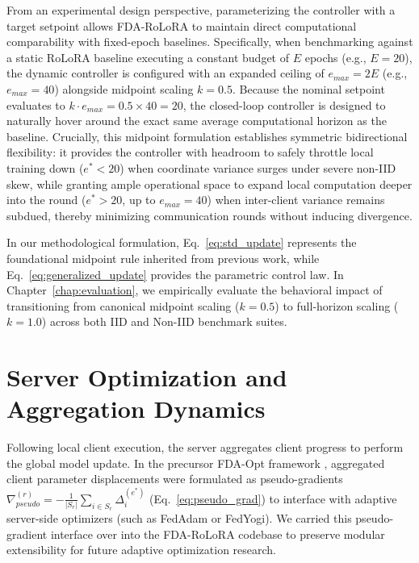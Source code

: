 From an experimental design perspective, parameterizing the controller with a target setpoint allows FDA-RoLoRA to maintain direct computational comparability with fixed-epoch baselines. Specifically, when benchmarking against a static RoLoRA baseline executing a constant budget of $E$ epochs (e.g., $E=20$), the dynamic controller is configured with an expanded ceiling of $e_{max} = 2E$ (e.g., $e_{max} = 40$) alongside midpoint scaling $k = 0.5$. Because the nominal setpoint evaluates to $k \cdot e_{max} = 0.5 \times 40 = 20$, the closed-loop controller is designed to naturally hover around the exact same average computational horizon as the baseline. Crucially, this midpoint formulation establishes symmetric bidirectional flexibility: it provides the controller with headroom to safely throttle local training down ($e^* < 20$) when coordinate variance surges under severe non-IID skew, while granting ample operational space to expand local computation deeper into the round ($e^* > 20$, up to $e_{max}=40$) when inter-client variance remains subdued, thereby minimizing communication rounds without inducing divergence.

In our methodological formulation, Eq.~\ref{eq:std_update} represents the foundational midpoint rule inherited from previous work, while Eq.~\ref{eq:generalized_update} provides the parametric control law. In Chapter~\ref{chap:evaluation}, we empirically evaluate the behavioral impact of transitioning from canonical midpoint scaling ($k=0.5$) to full-horizon scaling ($k=1.0$) across both IID and Non-IID benchmark suites.

\section{Server Optimization and Aggregation Dynamics}
\label{sec:server_optimizer}
Following local client execution, the server aggregates client progress to perform the global model update. In the precursor FDA-Opt framework \cite{theologitis2025fda}, aggregated client parameter displacements were formulated as pseudo-gradients $\nabla_{pseudo}^{(r)} = - \frac{1}{|S_r|} \sum_{i \in S_r} \Delta_i^{(e^*)}$ (Eq.~\ref{eq:pseudo_grad}) to interface with adaptive server-side optimizers (such as FedAdam or FedYogi). We carried this pseudo-gradient interface over into the FDA-RoLoRA codebase to preserve modular extensibility for future adaptive optimization research.

